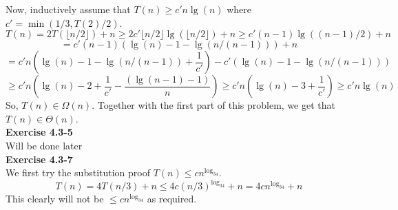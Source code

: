 \documentclass{article}
\begin{document}
Now, inductively assume that $T(n)\ge c'n\lg(n)$ where $c' = \min(1/3, T(2)/2)$. 
\[
T(n) = 2 T(\lfloor n/2 \rfloor) +n \ge 2c'\lfloor n/2 \rfloor \lg(\lfloor n/2 \rfloor) + n \ge c'(n-1) \lg((n-1)/2) +n
\]
\[
= c'(n-1)(\lg(n) - 1 - \lg(n/(n-1))) +n\]\[ = c' n (\lg(n) -1 -\lg(n/(n-1)) + \frac{1}{c'}) - c'(\lg(n) - 1 -\lg(n/(n-1)))
\]
\[
\ge c'n(\lg(n)-2 + \frac{1}{c'} - \frac{(\lg(n-1) - 1 )}{n}) \ge c'n(\lg(n)-3 + \frac{1}{c'}) \ge c'n\lg(n)
\]
So, $T(n)\in \Omega(n)$. Together with the first part of this problem, we get that $T(n)\in \Theta(n)$.\\
\noindent\textbf{Exercise 4.3-5}\\
Will be done later\\
\noindent\textbf{Exercise 4.3-7}\\
We first try the substitution proof $T(n) \le cn^{\log_34}$.
\[
T(n) = 4T(n/3)+n \le 4 c(n/3)^{\log_34}+n = 4cn^{\log_34}+n
\]
This clearly will not be $\le cn^{\log_34}$ as required.
\end{document}
